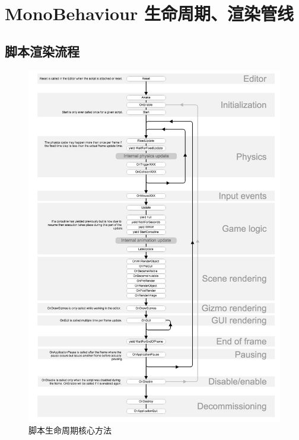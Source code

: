 \documentclass[UTF8,a4paper,12pt]{ctexbook}
\begin{document}
	\section{MonoBehaviour 生命周期、渲染管线}
		
		\subsection{脚本渲染流程}
			\begin{figure}[H]
				\centering
				\includegraphics[scale=0.44]{scriptLifeCircle.jpg}
				\caption{脚本生命周期核心方法}
			\end{figure}
			
\end{document}
